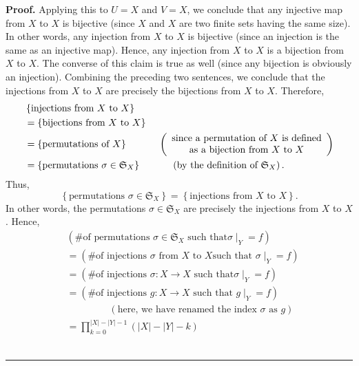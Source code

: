 \documentclass[numbers=enddot,12pt,final,onecolumn,notitlepage]{scrartcl}%
\numberwithin{exer}{section}
\theoremstyle{definition}
\newenvironment{proof}[1][Proof]{\noindent\textbf{#1.} }{\ \rule{0.5em}{0.5em}}
\let\prodnonlimits\prod
\renewcommand{\prod}{\prodnonlimits\limits}
\newenvironment{verlong}{}{}
\begin{document}
\begin{verlong}
\begin{proof}
Applying this to $U=X$ and $V=X$, we conclude that any injective map from $X$
to $X$ is bijective (since $X$ and $X$ are two finite sets having the same
size). In other words, any injection from $X$ to $X$ is bijective (since an
injection is the same as an injective map). Hence, any injection from $X$ to
$X$ is a bijection from $X$ to $X$. The converse of this claim is true as well
(since any bijection is obviously an injection). Combining the preceding two
sentences, we conclude that the injections from $X$ to $X$ are precisely the
bijections from $X$ to $X$. Therefore,
\begin{align*}
&  \left\{  \text{injections from }X\text{ to }X\right\} \\
&  =\left\{  \text{bijections from }X\text{ to }X\right\} \\
&  =\left\{  \text{permutations of }X\right\}  \ \ \ \ \ \ \ \ \ \ \left(
\begin{array}
[c]{c}%
\text{since a permutation of }X\text{ is defined}\\
\text{as a bijection from }X\text{ to }X
\end{array}
\right) \\
&  =\left\{  \text{permutations }\sigma\in\mathfrak{S}_{X}\right\}
\ \ \ \ \ \ \ \ \ \ \left(  \text{by the definition of }\mathfrak{S}%
_{X}\right)  .
\end{align*}
Thus,%
\[
\left\{  \text{permutations }\sigma\in\mathfrak{S}_{X}\right\}  =\left\{
\text{injections from }X\text{ to }X\right\}  .
\]
In other words, the permutations $\sigma\in\mathfrak{S}_{X}$ are precisely the
injections from $X$ to $X$. Hence,%
\begin{align*}
&  \left(  \text{\# of permutations }\sigma\in\mathfrak{S}_{X}\text{ such that
}\left.  \sigma\mid_{Y}\right.  =f\right) \\
&  =\left(  \text{\# of injections }\sigma\text{ from }X\text{ to }X\text{
such that }\left.  \sigma\mid_{Y}\right.  =f\right) \\
&  =\left(  \text{\# of injections }\sigma:X\rightarrow X\text{ such that
}\left.  \sigma\mid_{Y}\right.  =f\right) \\
&  =\left(  \text{\# of injections }g:X\rightarrow X\text{ such that }\left.
g\mid_{Y}\right.  =f\right) \\
&  \ \ \ \ \ \ \ \ \ \ \ \ \ \ \ \ \ \ \ \ \left(  \text{here, we have renamed
the index }\sigma\text{ as }g\right) \\
&  =\prod_{k=0}^{\left\vert X\right\vert -\left\vert Y\right\vert -1}\left(
\left\vert X\right\vert -\left\vert Y\right\vert -k\right)

\end{align*}
\end{proof}
\end{verlong}
\end{document}
